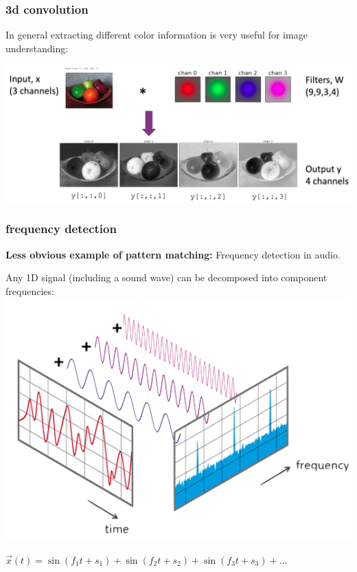 \documentclass[handout,compress]{beamer}
\begin{document}
\begin{frame}
	\frametitle{3d convolution}
	In general extracting different color information is very useful for image understanding:
	\begin{center}
		\includegraphics[width=\textwidth]{color_extract.png}
	\end{center}	
\end{frame}

\begin{frame}
	\frametitle{frequency detection}
	\textbf{Less obvious example of pattern matching:} Frequency detection in audio.
	\begin{center}
		Any 1D signal (including a sound wave) can be decomposed into component frequencies:
		\includegraphics[width=.6\textwidth]{simpledft.png}
		
		$\vec{x}(t) = \sin(f_1t + s_1) + \sin(f_2t + s_2) + \sin(f_3t + s_3) + \ldots$
	\end{center}
\end{frame}
\end{document}
